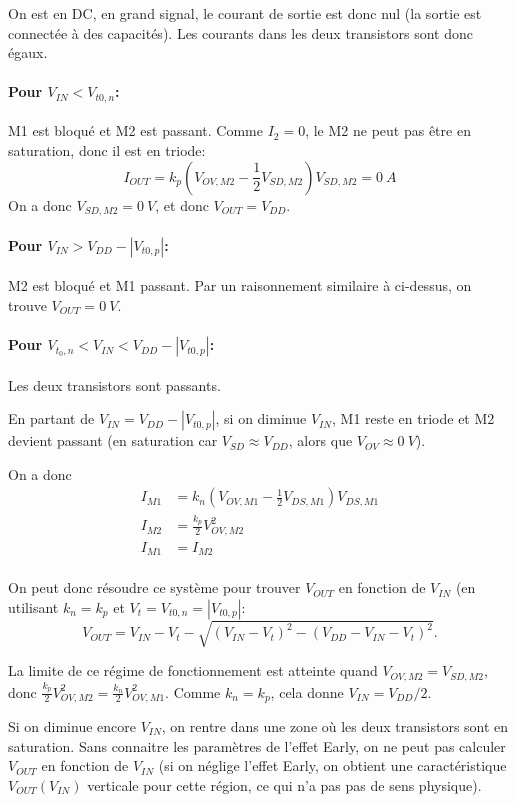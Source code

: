 \documentclass[frenchb,DIV=14]{scrartcl}
\begin{document}
On est en DC, en grand signal, le courant de sortie est donc nul (la sortie est
connectée à des capacités). Les courants dans les deux transistors sont donc
égaux.

\paragraph{Pour $V_{IN} < V_{t0,n}$:}
M1 est bloqué et M2 est passant.
Comme $I_{2} = 0$, le M2 ne peut pas être en saturation,
donc il est en triode:
\[I_{OUT} = k_p \left(V_{OV,M2} - \frac{1}{2} V_{SD,M2}\right)V_{SD,M2} = \SI{0}{A}\]
On a donc $V_{SD,M2} = \SI{0}{V}$, et donc $V_{OUT} = V_{DD}$.

\paragraph{Pour $V_{IN} > V_{DD} - \left|V_{t0,p}\right|$:}
M2 est bloqué et M1 passant. Par un raisonnement similaire à ci-dessus,
on trouve $V_{OUT} = \SI{0}{V}$.

\paragraph{Pour $V_{t_0,n} < V_{IN} < V_{DD} - \left|V_{t0,p}\right|$:}
Les deux transistors sont passants.

En partant de $V_{IN} = V_{DD} - \left|V_{t0,p}\right|$,
si on diminue $V_{IN}$, M1 reste en triode et M2 devient passant
(en saturation car $V_{SD} \approx V_{DD}$, alors que $V_{OV} \approx \SI{0}{V}$).

On a donc
\begin{align*}
    I_{M1} &= k_n \left(V_{OV,M1}-\frac{1}{2}V_{DS,M1}\right)V_{DS,M1} \\
    I_{M2} &= \frac{k_p}{2} V_{OV,M2}^2 \\
    I_{M1} &= I_{M2} \\
\end{align*}

On peut donc résoudre ce système pour trouver $V_{OUT}$ en fonction
de $V_{IN}$ (en utilisant $k_n = k_p$ et $V_t = V_{t0,n} = |V_{t0,p}|$:
\[V_{OUT} = V_{IN}-V_t - \sqrt{(V_{IN}-V_t)^2-(V_{DD}-V_{IN}-V_t)^2}.\]

La limite de ce régime de fonctionnement est atteinte quand
$V_{OV,M2} = V_{SD,M2}$, donc $\frac{k_p}{2}V_{OV,M2}^2 = \frac{k_n}{2}V_{OV,M1}^2$.
Comme $k_n = k_p$, cela donne $V_{IN} = V_{DD}/2$.

Si on diminue encore $V_{IN}$, on rentre dans une zone où les deux transistors sont en saturation.
Sans connaitre les paramètres de l'effet Early, on ne peut pas calculer
$V_{OUT}$ en fonction de $V_{IN}$ (si on néglige l'effet Early, on
obtient une caractéristique $V_{OUT}(V_{IN})$ verticale pour cette région,
ce qui n'a pas pas de sens physique).
\end{document}
